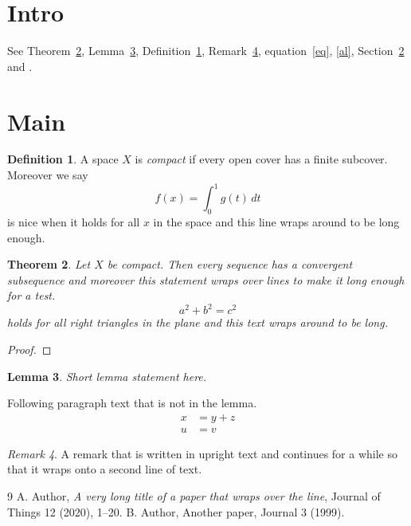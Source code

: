 \documentclass{amsart}
\newtheorem{theorem}{Theorem}[section]
\newtheorem{lemma}[theorem]{Lemma}
\theoremstyle{definition}\newtheorem{definition}[theorem]{Definition}
\theoremstyle{remark}\newtheorem{remark}[theorem]{Remark}
\begin{document}
\section{Intro}
See Theorem~\ref{thm}, Lemma~\ref{lem}, Definition~\ref{def}, Remark~\ref{rem}, equation~\eqref{eq}, \eqref{al}, Section~\ref{sec} and \cite{A}.
\lipsum[1]
\section{Main}\label{sec}
\lipsum[2]
\begin{definition}\label{def}
A space $X$ is \emph{compact} if every open cover has a finite subcover. Moreover we say
\[ f(x) = \int_0^1 g(t)\,dt \]
is nice when it holds for all $x$ in the space and this line wraps around to be long enough.
\end{definition}
\lipsum[3]
\begin{theorem}\label{thm}
Let $X$ be compact. Then every sequence has a convergent subsequence and moreover this statement wraps over lines to make it long enough for a test.
\begin{equation}\label{eq} a^2 + b^2 = c^2 \end{equation}
holds for all right triangles in the plane and this text wraps around to be long.
\end{theorem}
\begin{proof} \lipsum[4] \end{proof}
\begin{lemma}\label{lem} Short lemma statement here. \end{lemma}
Following paragraph text that is not in the lemma. \lipsum[5]
\begin{align}\label{al} x &= y + z \\ u &= v \end{align}
\begin{remark}\label{rem} A remark that is written in upright text and continues for a while so that it wraps onto a second line of text.\end{remark}
\lipsum[6]
\begin{thebibliography}{9}
 A. Author, \emph{A very long title of a paper that wraps over the line}, Journal of Things 12 (2020), 1--20.
 B. Author, Another paper, Journal 3 (1999).
\end{thebibliography}
\end{document}
